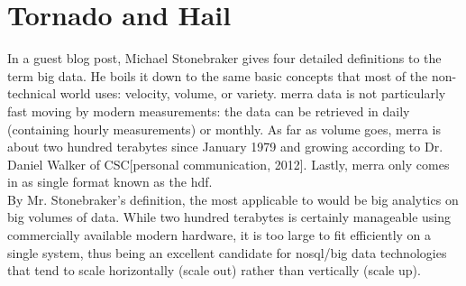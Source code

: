 


\chapter{Tornado and Hail}
In a guest blog post, Michael Stonebraker gives four detailed definitions to the term big data\cite{stonebraker}. He boils it down to the same basic concepts that most of the non-technical world uses: velocity, volume, or variety. \gls{merra} data is not particularly fast moving by modern measurements: the data can be retrieved in daily (containing hourly measurements) or monthly. As far as volume goes, \gls{merra} is about two hundred terabytes since January 1979 and growing according to Dr. Daniel Walker of CSC[personal communication, 2012]. Lastly, \gls{merra} only comes in as single format known as the \gls{hdf}\cite{hdf}.\\

By Mr. Stonebraker's definition, the most applicable to \climatedge would be big analytics on big volumes of data. While two hundred terabytes is certainly manageable using commercially available modern hardware, it is too large to fit efficiently on a single system, thus being an excellent candidate for \gls{nosql}/big data technologies that tend to scale horizontally (scale out) rather than vertically (scale up).




\renewcommand\bibname{{References}}





